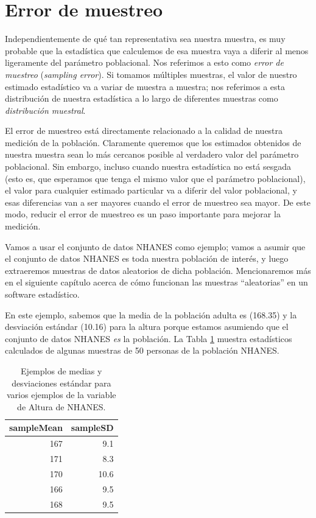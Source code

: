 \documentclass[
  12pt,
]{book}
\begin{document}
\hypertarget{samplingerror}{%
\section{Error de muestreo}\label{samplingerror}}

Independientemente de qué tan representativa sea nuestra muestra, es muy probable que la estadística que calculemos de esa muestra vaya a diferir al menos ligeramente del parámetro poblacional. Nos referimos a esto como \emph{error de muestreo} (\emph{sampling error}). Si tomamos múltiples muestras, el valor de nuestro estimado estadístico va a variar de muestra a muestra; nos referimos a esta distribución de nuestra estadística a lo largo de diferentes muestras como \emph{distribución muestral}.

El error de muestreo está directamente relacionado a la calidad de nuestra medición de la población. Claramente queremos que los estimados obtenidos de nuestra muestra sean lo más cercanos posible al verdadero valor del parámetro poblacional. Sin embargo, incluso cuando nuestra estadística no está sesgada (esto es, que esperamos que tenga el mismo valor que el parámetro poblacional), el valor para cualquier estimado particular va a diferir del valor poblacional, y esas diferencias van a ser mayores cuando el error de muestreo sea mayor. De este modo, reducir el error de muestreo es un paso importante para mejorar la medición.

Vamos a usar el conjunto de datos NHANES como ejemplo; vamos a asumir que el conjunto de datos NHANES es toda nuestra población de interés, y luego extraeremos muestras de datos aleatorios de dicha población. Mencionaremos más en el siguiente capítulo acerca de cómo funcionan las muestras ``aleatorias'' en un software estadístico.

En este ejemplo, sabemos que la media de la población adulta es (168.35) y la desviación estándar (10.16) para la altura porque estamos asumiendo que el conjunto de datos NHANES \emph{es} la población. La Tabla \ref{tab:sampleExample} muestra estadísticos calculados de algunas muestras de 50 personas de la población NHANES.

\begin{table}

\caption{\label{tab:sampleExample}Ejemplos de medias y desviaciones estándar para varios ejemplos de la variable de Altura de NHANES.}
\centering
\begin{tabular}[t]{r|r}
\hline
sampleMean & sampleSD\\
\hline
167 & 9.1\\
\hline
171 & 8.3\\
\hline
170 & 10.6\\
\hline
166 & 9.5\\
\hline
168 & 9.5\\
\hline
\end{tabular}
\end{table}
\end{document}
